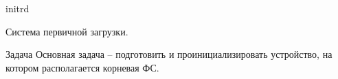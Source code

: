 \begin{frame}{initrd}

	Система первичной загрузки.

	\begin{block}{Задача}
		Основная задача -- подготовить и проинициализировать
		устройство, на котором располагается корневая ФС.
	\end{block}
\end{frame}
